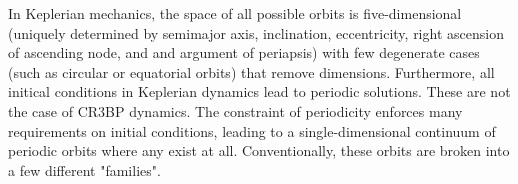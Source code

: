\documentclass{article}
\begin{document}
In Keplerian mechanics, the space of all possible orbits is five-dimensional (uniquely determined by semimajor axis, inclination, eccentricity, right ascension of ascending node, and and argument of periapsis) with few degenerate cases (such as circular or equatorial orbits) that remove dimensions. Furthermore, all initical conditions in Keplerian dynamics lead to periodic solutions. These are  not the case of CR3BP dynamics. The constraint of periodicity enforces many requirements on initial conditions, leading to a single-dimensional continuum of periodic orbits where any exist at all. Conventionally, these orbits are broken into a few different "families".
\end{document}
